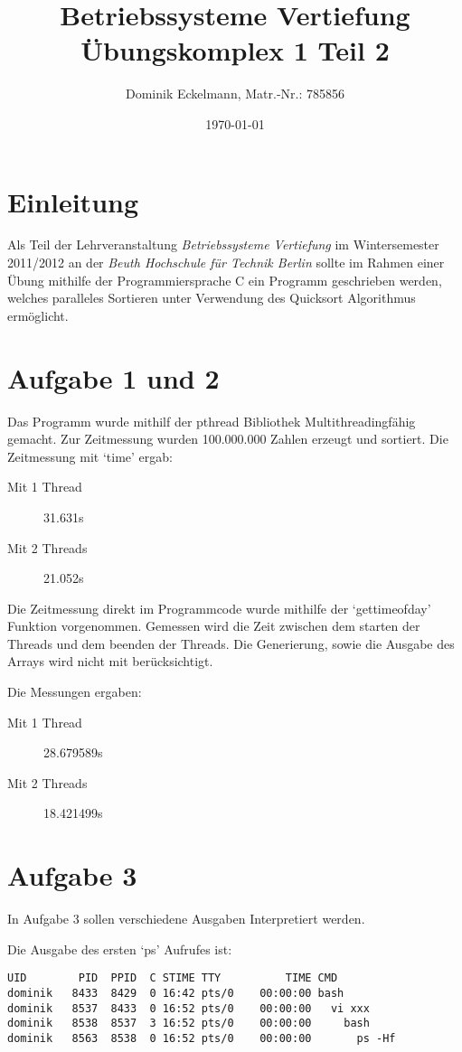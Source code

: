 \documentclass[a4paper]{article}
\title{Betriebssysteme Vertiefung \\ Übungskomplex 1 Teil 2}
\author{Dominik Eckelmann, Matr.-Nr.: 785856}
\date{\today}
\begin{document}
\maketitle

\tableofcontents

\section{Einleitung}
Als Teil der Lehrveranstaltung \textit{Betriebssysteme Vertiefung} im Wintersemester 2011/2012 an der \textit{Beuth Hochschule für Technik Berlin} sollte im Rahmen einer Übung mithilfe der Programmiersprache C ein Programm geschrieben werden, welches paralleles Sortieren unter Verwendung
des Quicksort Algorithmus ermöglicht.

\section{Aufgabe 1 und 2}

Das Programm wurde mithilf der pthread Bibliothek Multithreadingfähig gemacht.
Zur Zeitmessung wurden 100.000.000 Zahlen erzeugt und sortiert.
Die Zeitmessung mit `time' ergab:

\begin{description}
\item[Mit 1 Thread] 31.631s
\item[Mit 2 Threads] 21.052s
\end{description}

Die Zeitmessung direkt im Programmcode wurde mithilfe der `gettimeofday' Funktion vorgenommen.
Gemessen wird die Zeit zwischen dem starten der Threads und dem beenden der Threads.
Die Generierung, sowie die Ausgabe des Arrays wird nicht mit berücksichtigt.

Die Messungen ergaben:
\begin{description}
\item[Mit 1 Thread] 28.679589s
\item[Mit 2 Threads] 18.421499s
\end{description}

\section{Aufgabe 3}

In Aufgabe 3 sollen verschiedene Ausgaben Interpretiert werden.

Die Ausgabe des ersten `ps' Aufrufes ist:
\begin{verbatim}
UID        PID  PPID  C STIME TTY          TIME CMD
dominik   8433  8429  0 16:42 pts/0    00:00:00 bash
dominik   8537  8433  0 16:52 pts/0    00:00:00   vi xxx
dominik   8538  8537  3 16:52 pts/0    00:00:00     bash
dominik   8563  8538  0 16:52 pts/0    00:00:00       ps -Hf
\end{verbatim}
\end{document}
